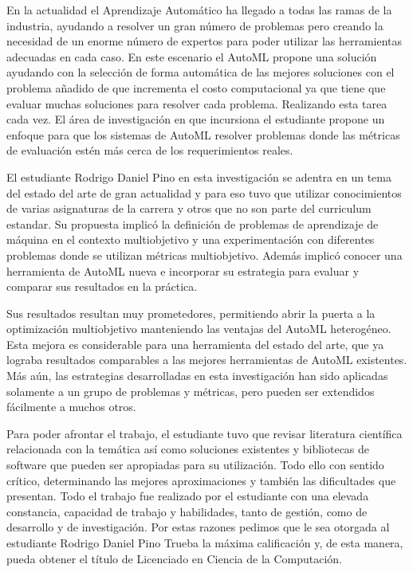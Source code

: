 \begin{opinion}
En la actualidad el Aprendizaje Automático ha llegado a todas las ramas de la industria, ayudando a resolver un gran número de problemas pero creando la necesidad de un enorme número de expertos para poder utilizar las herramientas adecuadas en cada caso.
En este escenario el AutoML propone una solución ayudando con la selección de forma automática de las mejores soluciones con el problema añadido de que incrementa
el costo computacional ya que tiene que evaluar muchas soluciones para resolver cada problema. Realizando esta tarea cada vez. El área de investigación en que incursiona el estudiante propone un enfoque para que los sistemas de AutoML resolver problemas donde las métricas de evaluación estén más cerca de los requerimientos reales.

El estudiante Rodrigo Daniel Pino en esta investigación se adentra en un tema del estado del arte de gran actualidad y para eso tuvo que utilizar conocimientos de varias asignaturas de la carrera y otros que no son parte del curriculum estandar. Su propuesta implicó la definición de problemas de aprendizaje de máquina en el contexto multiobjetivo y una experimentación con diferentes problemas donde se utilizan métricas multiobjetivo. Además implicó conocer una herramienta de AutoML nueva e incorporar su estrategia para evaluar y comparar sus resultados en la práctica.

Sus resultados resultan muy prometedores, permitiendo abrir la puerta a la optimización multiobjetivo manteniendo las ventajas del AutoML heterogéneo.
Esta mejora es considerable para una herramienta del estado del arte, que ya lograba resultados comparables a las mejores herramientas de AutoML existentes.
Más aún, las estrategias desarrolladas en esta investigación han sido aplicadas solamente a un grupo de problemas y métricas, pero pueden ser extendidos fácilmente a muchos otros.

Para poder afrontar el trabajo, el estudiante tuvo que revisar literatura científica relacionada con la temática así como soluciones existentes y bibliotecas de software que pueden ser apropiadas para su utilización. Todo ello con sentido crítico, determinando las mejores aproximaciones y también las dificultades que presentan.
Todo el trabajo fue realizado por el estudiante con una elevada constancia, capacidad de trabajo y habilidades, tanto de gestión, como de desarrollo y de investigación.
Por estas razones pedimos que le sea otorgada al estudiante  Rodrigo Daniel Pino Trueba la máxima calificación y, de esta manera, pueda obtener el título de Licenciado en Ciencia de la Computación.


\begingroup
  \centering
  \hspace{1cm}
  \par
\endgroup
\end{opinion}
